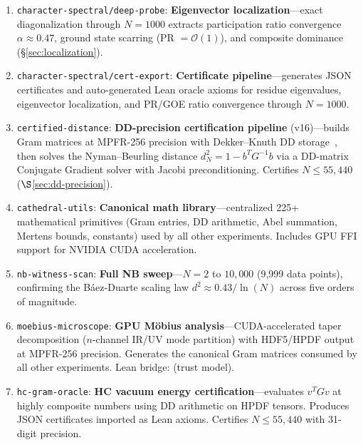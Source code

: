 \documentclass[11pt,a4paper]{article}
\begin{document}
\begin{enumerate}
{    universality}---tests residue class decomposition across
    $m \in \{3,5,7,8,12\}$ through $N = 1000$. Discovers the universal
    equation of state $N_c(m) \approx 60\,m/\varphi(m)$ and falsifies
    the Bott periodicity hypothesis (\S\ref{sec:universality}).
  \item \texttt{character-spectral/deep-probe}: \textbf{Eigenvector
    localization}---exact diagonalization through $N = 1000$ extracts
    participation ratio convergence $\alpha \approx 0.47$, ground state
    scarring (PR $= \mathcal{O}(1)$), and composite dominance
    (\S\ref{sec:localization}).
  \item \texttt{character-spectral/cert-export}: \textbf{Certificate
    pipeline}---generates JSON certificates and auto-generated Lean
    oracle axioms for residue eigenvalues, eigenvector localization,
    and PR/GOE ratio convergence through $N = 1000$.
  \item \texttt{certified-distance}: \textbf{DD-precision certification
    pipeline} (v16)---builds Gram matrices at MPFR-256 precision with
    Dekker--Knuth DD storage~\cite{dekker1971}, then solves the
    Nyman--Beurling distance $d_N^2 = 1 - b^T G^{-1} b$ via a DD-matrix
    Conjugate Gradient solver with Jacobi preconditioning. Certifies
    $N \leq 55{,}440$ ($\S$\ref{sec:dd-precision}).
  \item \texttt{cathedral-utils}: \textbf{Canonical math library}---centralized
    225+ mathematical primitives (Gram entries, DD arithmetic, Abel summation,
    Mertens bounds, constants) used by all other experiments. Includes
    GPU FFI support for NVIDIA CUDA acceleration.
  \item \texttt{nb-witness-scan}: \textbf{Full NB sweep}---$N = 2$ to $10{,}000$
    (9,999 data points), confirming the B\'aez-Duarte scaling law
    $d^2 \approx 0.43/\ln(N)$ across five orders of magnitude.
  \item \texttt{moebius-microscope}: \textbf{GPU M\"obius analysis}---CUDA-accelerated
    taper decomposition ($n$-channel IR/UV mode partition) with HDF5/HPDF
    output at MPFR-256 precision. Generates the canonical Gram matrices
    consumed by all other experiments. Lean bridge:
     (trust model).
  \item \texttt{hc-gram-oracle}: \textbf{HC vacuum energy certification}---evaluates
    $v^T G v$ at highly composite numbers using DD arithmetic on HPDF
    tensors. Produces JSON certificates imported as Lean axioms.
    Certifies $N \leq 55{,}440$ with 31-digit precision.

\end{enumerate}
\end{document}
